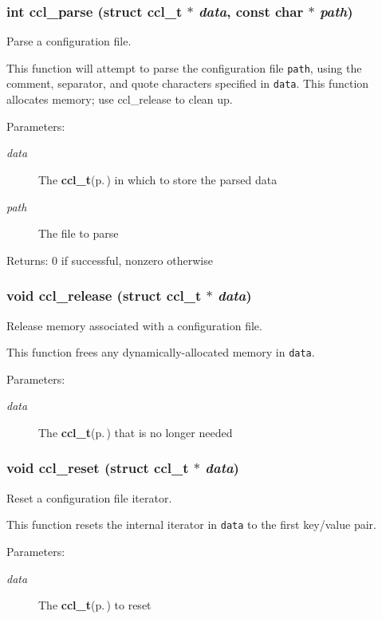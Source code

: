 \subsubsection{\setlength{\rightskip}{0pt plus 5cm}int ccl\_\-parse (struct {\bf ccl\_\-t} $\ast$ {\em data}, const char $\ast$ {\em path})}\label{ccl_8h_a1}


Parse a configuration file. 

This function will attempt to parse the configuration file {\tt path}, using the comment, separator, and quote characters specified in {\tt data}. This function allocates memory; use ccl\_\-release to clean up. \begin{Desc}
\item[Parameters:]
\begin{description}
\item[{\em data}]The {\bf ccl\_\-t}{\rm (p.\,\pageref{structccl__t})} in which to store the parsed data \item[{\em path}]The file to parse \end{description}
\end{Desc}
\begin{Desc}
\item[Returns:]0 if successful, nonzero otherwise \end{Desc}
\subsubsection{\setlength{\rightskip}{0pt plus 5cm}void ccl\_\-release (struct {\bf ccl\_\-t} $\ast$ {\em data})}\label{ccl_8h_a2}


Release memory associated with a configuration file. 

This function frees any dynamically-allocated memory in {\tt data}. \begin{Desc}
\item[Parameters:]
\begin{description}
\item[{\em data}]The {\bf ccl\_\-t}{\rm (p.\,\pageref{structccl__t})} that is no longer needed \end{description}
\end{Desc}
\subsubsection{\setlength{\rightskip}{0pt plus 5cm}void ccl\_\-reset (struct {\bf ccl\_\-t} $\ast$ {\em data})}\label{ccl_8h_a5}


Reset a configuration file iterator. 

This function resets the internal iterator in {\tt data} to the first key/value pair. \begin{Desc}
\item[Parameters:]
\begin{description}
\item[{\em data}]The {\bf ccl\_\-t}{\rm (p.\,\pageref{structccl__t})} to reset \end{description}
\end{Desc}
